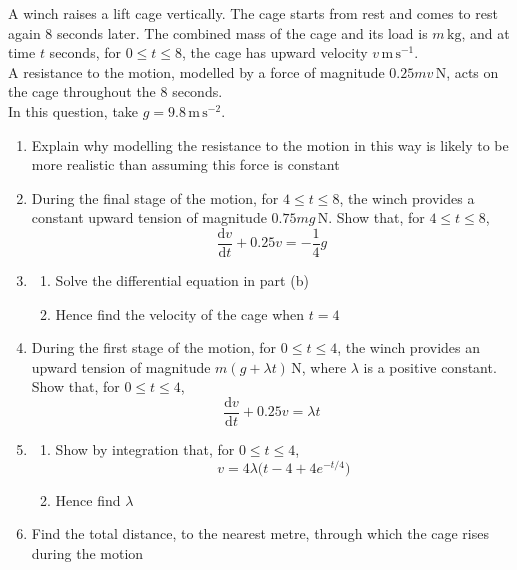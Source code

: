 \documentclass[leqno]{article}
\begin{document}
\begin{enumerate}[
  label=\textbf{\arabic*.},
  leftmargin=*,
  topsep=0pt,
  partopsep=0pt,
  parsep=0pt
]
\newpage

\questionitem

A winch raises a lift cage vertically. The cage starts from rest and comes to rest again $8$ seconds later. The combined mass of the cage and its load is $m\,\mathrm{kg}$, and at time $t$ seconds, for $0\le t\le 8$, the cage has upward velocity $v\,\mathrm{m\,s^{-1}}$. \\
A resistance to the motion, modelled by a force of magnitude $0.25mv\,\mathrm{N}$, acts on the cage throughout the $8$ seconds. \\
In this question, take $g = 9.8\,\mathrm{m\,s^{-2}}$. \\
\begin{enumerate}[label=\textbf{(\alph*)}]
  \item Explain why modelling the resistance to the motion in this way is likely to be more realistic than assuming this force is constant  \\
  \item During the final stage of the motion, for $4\le t\le 8$, the winch provides a constant upward tension of magnitude $0.75mg\,\mathrm{N}$. Show that, for $4\le t\le 8$,
  \[
  \frac{\mathrm{d}v}{\mathrm{d}t}+0.25v=-\frac{1}{4}g
  \] 
  \item 
  \begin{enumerate}[label=(\roman*)]
    \item Solve the differential equation in part (b) 
    \item Hence find the velocity of the cage when $t=4$  \\
  \end{enumerate}
  \item During the first stage of the motion, for $0\le t\le 4$, the winch provides an upward tension of magnitude $m(g+\lambda t)\,\mathrm{N}$, where $\lambda$ is a positive constant. Show that, for $0\le t\le 4$,
  \[
  \frac{\mathrm{d}v}{\mathrm{d}t}+0.25v=\lambda t
  \] 
  \item 
  \begin{enumerate}[label=(\roman*)]
    \item Show by integration that, for $0\le t\le 4$,
    \[
    v=4\lambda\bigl(t-4+4e^{-t/4}\bigr)
    \] 
    \item Hence find $\lambda$  \\
  \end{enumerate}
  \item Find the total distance, to the nearest metre, through which the cage rises during the motion  \\
\end{enumerate}


\end{enumerate}
\end{document}
